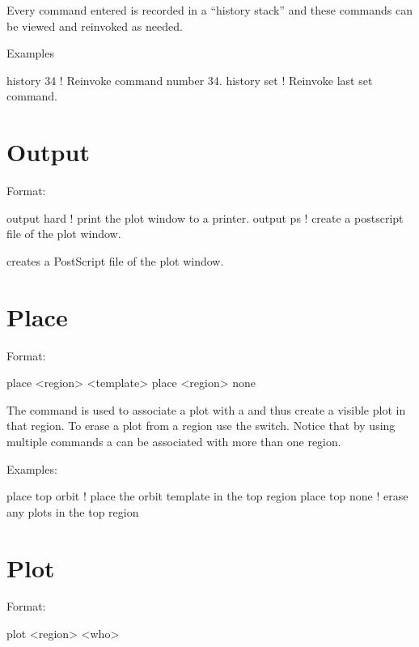 \vskip 0.2in
Every \tao command entered is recorded in a ``history stack'' and
these commands can be viewed and reinvoked as needed. 

Examples
\begin{example}
  history 34   ! Reinvoke command number 34.
  history set  ! Reinvoke last set command.  
\end{example}

\section{Output}
\label{s:output}

Format:
\begin{example}
  output hard     ! print the plot window to a printer.
  output ps       ! create a postscript file of the plot window.
\end{example}

\vskip 0.2in
 creates a PostScript file of the plot window. 

\section{Place}
\label{s:place}

Format:
\begin{example}
  place <region> <template>
  place <region> none
\end{example}

\vskip 0.2in The  command is used to associate a
 plot with a  and thus create a visible
plot in that region. To erase a plot from a region use the 
switch. Notice that by using multiple  commands a
 can be associated with more than one region. 

Examples:
\begin{example}
  place top orbit  ! place the orbit template in the top region
  place top none   ! erase any plots in the top region
\end{example}

\section{Plot}
\label{s:plot}

Format:
\begin{example}
  plot <region> <who>
\end{example}

